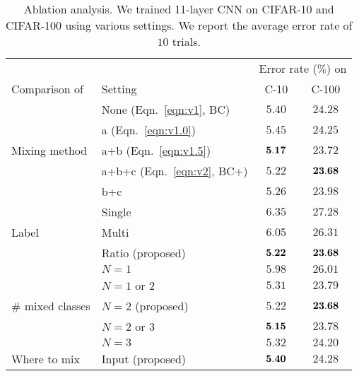 \documentclass[10pt,twocolumn,letterpaper]{article}
\begin{document}
\begin{table}
	\centering
	\caption{Ablation analysis. We trained 11-layer CNN on CIFAR-10 and CIFAR-100 using various settings. We report the average error rate of $10$ trials.}
	\label{tab:ablation}
	\vspace{2mm}
	\small
	\begin{tabular}{llcc}
		\toprule
		&& \multicolumn{2}{c}{Error rate ($\%$) on} \\
		Comparison of & Setting & C-10 & C-100 \\
		\midrule
		\multirow{5}{*}{Mixing method}
					& None (Eqn.~\ref{eqn:v1}, BC)    & $5.40$ & $24.28 $ \\
					& a (Eqn.~\ref{eqn:v1.0})          & $5.45$ & $24.25 $ \\
					& a+b (Eqn.~\ref{eqn:v1.5})       & ${\bf 5.17} $ &$23.72$ \\
					& a+b+c (Eqn.~\ref{eqn:v2}, BC+)   & $5.22$ & ${\bf 23.68}$ \\
					& b+c          & $5.26$ &$23.98$ \\
		\midrule
		\multirow{3}{*}{Label} & Single	 		& $6.35$ & $27.28$ \\
						 & Multi			& $6.05$ & $26.31$ \\
			 			& Ratio (proposed)	& ${\bf 5.22}$ & ${\bf 23.68}$ \\
		\midrule
		\multirow{5}{*}{\# mixed classes} & $N=1$ 		      & $5.98$ & $26.01$ \\
								     & $N=1$ or $2$ 	      & $5.31$ & $23.79$ \\
	 							     & $N=2$ (proposed)  & $5.22$ & ${\bf 23.68}$ \\
								     & $N=2$ or $3$ 	     & ${\bf 5.15}$ & $23.78$ \\
								     & $N=3$  		      & $5.32$ & $24.20$ \\
		\midrule
		\multirow{6}{*}{Where to mix} 	& Input (proposed)   & ${\bf 5.40}$ & $24.28$ \\

\end{tabular}
\end{table}
\end{document}
